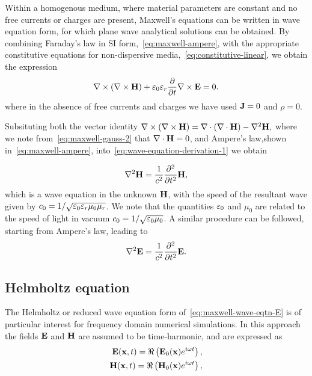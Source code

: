 Within a homogenous medium, where material parameters are constant and no free
currents or charges are present, Maxwell's equations can be written in wave
equation form, for which plane wave analytical solutions can be
obtained\cite{Jackson:490457}. By combining Faraday's law in SI
form,~\eqref{eq:maxwell-ampere}, with the appropriate constitutive equations for
non-dispersive media,~\eqref{eq:constitutive-linear}, we obtain the expression
\begin{equation}
  \label{eq:wave-equation-derivation-1}
  \nabla \times ( \nabla \times \mathbf{H} ) + \varepsilon_0 \varepsilon_r \frac{\partial}{\partial t}  \nabla \times \mathbf{E} = 0 .
\end{equation}
where in the absence of free currents and charges we have used $\mathbf{J} = 0$ and
$\rho = 0$.

Subsituting both the vector identity $ \nabla \times ( \nabla \times \mathbf{H} ) = \nabla \cdot ( \nabla \cdot \mathbf{H} ) - \nabla^2 \mathbf{H},
$
where we note from~\eqref{eq:maxwell-gauss-2} that $\nabla \cdot \mathbf{H} = 0$, and
Ampere's law,shown in~\eqref{eq:maxwell-ampere},
into~\eqref{eq:wave-equation-derivation-1} we obtain

\begin{equation}
  \label{eq:maxwell-wave-eqtn-H}
  \nabla^2 \mathbf{H} = \frac{1}{c^2} \frac{\partial^2}{\partial t^2}{ \mathbf{H} },
\end{equation}
which is a wave equation in the unknown $\mathbf{H}$, with the speed of the resultant wave given by $c_0 = 1/\sqrt{\varepsilon_0 \varepsilon_r \mu_0 \mu_r }$. We note that
the quantities $\varepsilon_0$ and $\mu_0$ are related to the speed of light 
in vacuum $c_0 = 1/\sqrt{\varepsilon_0 \mu_0 }$. A similar procedure can be followed, starting from
Ampere's law, leading to
\begin{equation}
  \label{eq:maxwell-wave-eqtn-E}
  \nabla^2 \mathbf{E} = \frac{1}{c^2} \frac{\partial^2}{\partial t^2}{ \mathbf{E} } .
\end{equation}

\subsection{Helmholtz equation}
The Helmholtz or reduced wave equation form of~\eqref{eq:maxwell-wave-eqtn-E} is
of particular interest for frequency domain numerical simulations. In this
approach the fields $\mathbf{E}$ and $\mathbf{H}$ are assumed to be time-harmonic, and are
expressed as
\begin{align}
  \label{eq:maxwell-helmholtz-time-harmonic}
  \mathbf{E}(\mathbf{x},t) = \Re \left( \mathbf{E}_0(\mathbf{x}) e^{i \omega t} \right), \\
  \mathbf{H}(\mathbf{x},t) = \Re \left( \mathbf{H}_0(\mathbf{x}) e^{i \omega t} \right),
\end{align}

